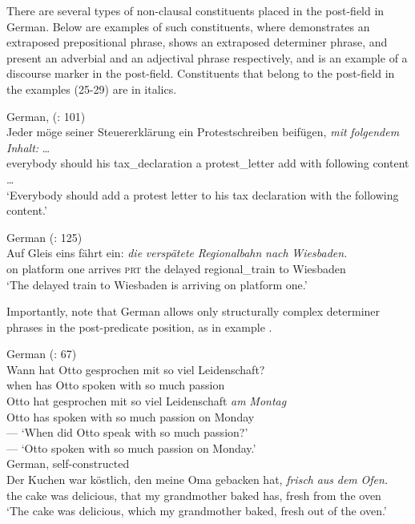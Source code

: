 There are several types of non-clausal constituents placed in the post-field in German. Below are examples of such constituents, where  demonstrates an extraposed prepositional phrase,  shows an extraposed determiner phrase,  and  present an adverbial and an adjectival phrase respectively, and  is an example of a discourse marker in the post-field. Constituents that belong to the post-field in the examples (25-29) are in italics.

\ea%
  \label{ex:key:25} German, (\citealt{Hartmann2017}: 101)\\
\gll Jeder    möge    seiner    Steuererklärung  ein Protestschreiben  beifügen,  \textit{mit} \textit{folgendem} \textit{Inhalt:} … \\
everybody  should    his    tax\_declaration  a protest\_letter    add    with  following  content …\\
\glt ‘Everybody should add a protest letter to his tax declaration with the following content.’ 
  \z

\ea%
  \label{ex:key:26} German (\citealt{AkanHartmann2019}: 125)\\
\gll Auf  Gleis    eins  fährt  ein:  \textit{die} \textit{verspätete} \textit{Regionalbahn} \textit{nach} \textit{Wiesbaden.}\\
on  platform  one  arrives  \textsc{prt}  the  delayed  regional\_train to  Wiesbaden\\
\glt ‘The delayed train to Wiesbaden is arriving on platform one.’ 
  \z

Importantly, \citet{AkanHartmann2019} note that German allows only structurally complex determiner phrases in the post-predicate position, as in example .

\ea%
  \label{ex:key:A} German (\citealt{Frey2015}: 67)\\
\gll Wann  hat  Otto  gesprochen  mit  so  viel  Leidenschaft?  \\
  when  has  Otto  spoken    with  so  much  passion\\

  \gll Otto  hat  gesprochen  mit  so  viel  Leidenschaft  \textit{am} \textit{Montag}\\
Otto  has  spoken    with  so  much  passion  on  Monday\\
\glt --- ‘When did Otto speak with so much passion?’\\
     --- ‘Otto spoken with so much passion on Monday.’  \\
  \z
\newpage
\ea%
  \label{ex:key:B} German, self-constructed\\
\gll Der  Kuchen  war  köstlich,  den  meine    Oma   gebacken  hat,  \textit{frisch} \textit{aus} \textit{dem} \textit{Ofen.}\\
 the  cake    was  delicious,  that  my    grandmother baked    has,  fresh  from  the  oven\\
\glt ‘The cake was delicious, which my grandmother baked, fresh out of the oven.’ 
  \z

